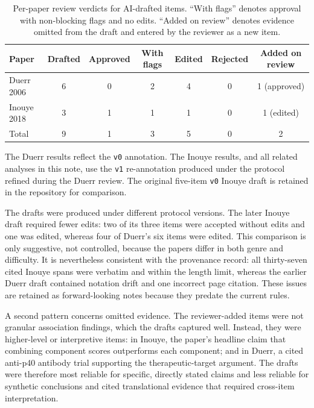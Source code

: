 \begin{table}[H]  %
  \centering
  \small
  \begin{tabular}{lcccccc}
    \toprule
    Paper & Drafted & Approved & With flags & Edited & Rejected & Added on review \\
    \midrule
    Duerr 2006   & 6 & 0 & 2 & 4 & 0 & 1 (approved) \\
    Inouye 2018  & 3 & 1 & 1 & 1 & 0 & 1 (edited) \\
    \midrule
    Total        & 9 & 1 & 3 & 5 & 0 & 2 \\
    \bottomrule
  \end{tabular}
  \caption[Per-paper AI-track review verdicts]{Per-paper review verdicts
  for AI-drafted items. ``With flags'' denotes approval with non-blocking
  flags and no edits. ``Added on review'' denotes evidence omitted from the
  draft and entered by the reviewer as a new item.}
  \label{tab:ai-review}
\end{table}

The Duerr results reflect the \texttt{v0} annotation. The Inouye results,
and all related analyses in this note, use the \texttt{v1} re-annotation
produced under the protocol refined during the Duerr review. The original
five-item \texttt{v0} Inouye draft is retained in the repository for
comparison.

The drafts were produced under different protocol versions. The later Inouye
draft required fewer edits: two of its three items were accepted without
edits and one was edited, whereas four of Duerr's six items were edited.
This comparison is only suggestive, not controlled, because the papers differ
in both genre and difficulty. It is nevertheless consistent with the
provenance record: all thirty-seven cited Inouye spans were verbatim and
within the length limit, whereas the earlier Duerr draft contained notation
drift and one incorrect page citation. These issues are retained as
forward-looking notes because they predate the current rules.

A second pattern concerns omitted evidence. The reviewer-added items were not
granular association findings, which the drafts captured well. Instead, they
were higher-level or interpretive items: in Inouye, the paper's headline
claim that combining component scores outperforms each component; and in
Duerr, a cited anti-p40 antibody trial supporting the therapeutic-target
argument. The drafts were therefore most reliable for specific, directly
stated claims and less reliable for synthetic conclusions and cited
translational evidence that required cross-item interpretation.

